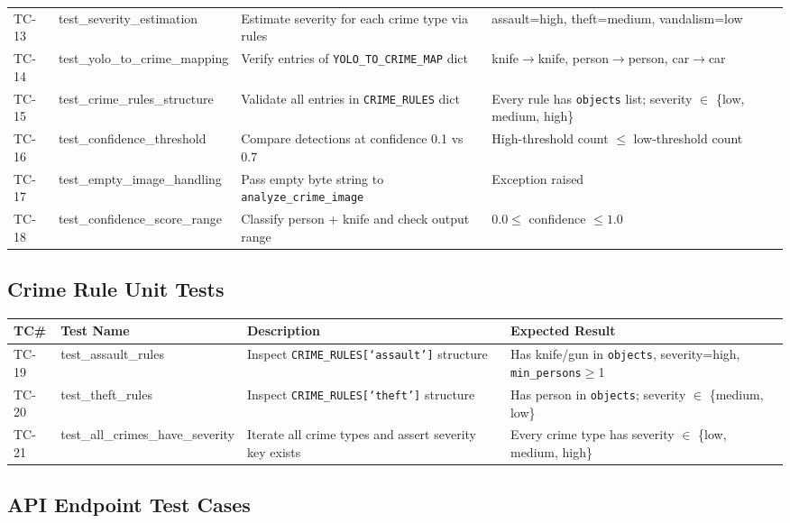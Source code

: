 \documentclass[12pt,a4paper]{report}
\begin{document}
\begin{longtable}{@{}p{0.8cm}p{4.2cm}p{5.5cm}p{4cm}@{}}
\addlinespace
TC-13 & test\_severity\_estimation & Estimate severity for each crime type via rules & assault=high, theft=medium, vandalism=low \\
\addlinespace
TC-14 & test\_yolo\_to\_crime\_mapping & Verify entries of \texttt{YOLO\_TO\_CRIME\_MAP} dict & knife$\to$knife, person$\to$person, car$\to$car \\
\addlinespace
TC-15 & test\_crime\_rules\_structure & Validate all entries in \texttt{CRIME\_RULES} dict & Every rule has \texttt{objects} list; severity $\in$ \{low, medium, high\} \\
\addlinespace
TC-16 & test\_confidence\_threshold & Compare detections at confidence 0.1 vs 0.7 & High-threshold count $\leq$ low-threshold count \\
\addlinespace
TC-17 & test\_empty\_image\_handling & Pass empty byte string to \texttt{analyze\_crime\_image} & Exception raised \\
\addlinespace
TC-18 & test\_confidence\_score\_range & Classify person + knife and check output range & $0.0 \leq$ confidence $\leq 1.0$ \\
\bottomrule
\end{longtable}
\normalsize

\subsection{Crime Rule Unit Tests}

\small
\begin{longtable}{@{}p{0.8cm}p{4.2cm}p{5.5cm}p{4cm}@{}}
\toprule
\textbf{TC\#} & \textbf{Test Name} & \textbf{Description} & \textbf{Expected Result} \\
\midrule
\endhead
TC-19 & test\_assault\_rules & Inspect \texttt{CRIME\_RULES[`assault']} structure & Has knife/gun in \texttt{objects}, severity=high, \texttt{min\_persons}$\geq$1 \\
\addlinespace
TC-20 & test\_theft\_rules & Inspect \texttt{CRIME\_RULES[`theft']} structure & Has person in \texttt{objects}; severity $\in$ \{medium, low\} \\
\addlinespace
TC-21 & test\_all\_crimes\_have\_severity & Iterate all crime types and assert severity key exists & Every crime type has severity $\in$ \{low, medium, high\} \\
\bottomrule
\end{longtable}
\normalsize

\subsection{API Endpoint Test Cases}
\end{document}
